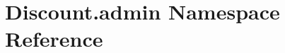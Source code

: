 \hypertarget{namespace_discount_1_1admin}{}\section{Discount.\+admin Namespace Reference}
\label{namespace_discount_1_1admin}
